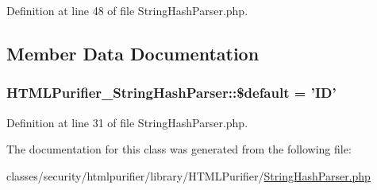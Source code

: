Definition at line 48 of file String\+Hash\+Parser.\+php.



\subsection{Member Data Documentation}
\hypertarget{classHTMLPurifier__StringHashParser_a166b076f78ab5974134a32a41b11343c}{
\subsubsection[{\$default}]{\setlength{\rightskip}{0pt plus 5cm}H\+T\+M\+L\+Purifier\+\_\+\+String\+Hash\+Parser\+::\$default = 'I\+D'}}\label{classHTMLPurifier__StringHashParser_a166b076f78ab5974134a32a41b11343c}


Definition at line 31 of file String\+Hash\+Parser.\+php.



The documentation for this class was generated from the following file\+:\begin{DoxyCompactItemize}
\item 
classes/security/htmlpurifier/library/\+H\+T\+M\+L\+Purifier/\hyperlink{StringHashParser_8php}{String\+Hash\+Parser.\+php}\end{DoxyCompactItemize}
